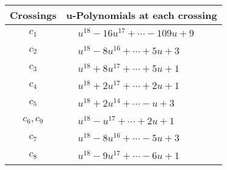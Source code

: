 \documentclass[1p]{elsarticle_modified}
\theoremstyle{definition}
\begin{document}
\begin{tabular}{m{50pt}|m{274pt}}
Crossings & \hspace{64pt}u-Polynomials at each crossing \\
\hline $$\begin{aligned}c_{1}\end{aligned}$$&$\begin{aligned}
&u^{18}-16 u^{17}+\cdots-109 u+9
\end{aligned}$\\
\hline $$\begin{aligned}c_{2}\end{aligned}$$&$\begin{aligned}
&u^{18}-8 u^{16}+\cdots+5 u+3
\end{aligned}$\\
\hline $$\begin{aligned}c_{3}\end{aligned}$$&$\begin{aligned}
&u^{18}+8 u^{17}+\cdots+5 u+1
\end{aligned}$\\
\hline $$\begin{aligned}c_{4}\end{aligned}$$&$\begin{aligned}
&u^{18}+2 u^{17}+\cdots+2 u+1
\end{aligned}$\\
\hline $$\begin{aligned}c_{5}\end{aligned}$$&$\begin{aligned}
&u^{18}+2 u^{14}+\cdots- u+3
\end{aligned}$\\
\hline $$\begin{aligned}c_{6},c_{9}\end{aligned}$$&$\begin{aligned}
&u^{18}- u^{17}+\cdots+2 u+1
\end{aligned}$\\
\hline $$\begin{aligned}c_{7}\end{aligned}$$&$\begin{aligned}
&u^{18}-8 u^{16}+\cdots-5 u+3
\end{aligned}$\\
\hline $$\begin{aligned}c_{8}\end{aligned}$$&$\begin{aligned}
&u^{18}-9 u^{17}+\cdots-6 u+1
\end{aligned}$\\

\end{tabular}
\end{document}
